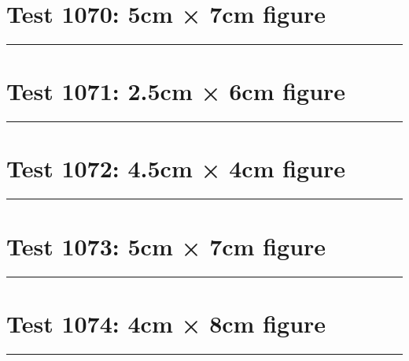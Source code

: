 \documentclass[a4paper,11pt]{article}
\begin{document}
\section*{Test 1070: 5cm × 7cm figure}
\begin{swarmwrap}%
  \begin{minipage}[t]{5cm}
    \centering
    \rule{\linewidth}{7cm}
  \end{minipage}%
\end{swarmwrap}%
\swarmwrapnext
\lipsum[53]
\lipsum[54]
\lipsum[55]
\lipsum[56]
\section*{Test 1071: 2.5cm × 6cm figure}
\begin{swarmwrap}%
  \begin{minipage}[t]{2cm}
    \centering
    \rule{\linewidth}{6cm}
  \end{minipage}%
\end{swarmwrap}%
\swarmwrapnext
\lipsum[35]
\lipsum[36]
\lipsum[37]
\lipsum[38]
\lipsum[39]
\section*{Test 1072: 4.5cm × 4cm figure}
\begin{swarmwrap}%
  \begin{minipage}[t]{4cm}
    \centering
    \rule{\linewidth}{4cm}
  \end{minipage}%
\end{swarmwrap}%
\swarmwrapnext
\lipsum[31]
\lipsum[32]
\lipsum[33]
\lipsum[34]
\lipsum[35]
\section*{Test 1073: 5cm × 7cm figure}
\begin{swarmwrap}%
  \begin{minipage}[t]{5cm}
    \centering
    \rule{\linewidth}{7cm}
  \end{minipage}%
\end{swarmwrap}%
\swarmwrapnext
\lipsum[1]
\lipsum[2]
\lipsum[3]
\lipsum[4]
\lipsum[5]
\lipsum[6]
\section*{Test 1074: 4cm × 8cm figure}
\begin{swarmwrap}%
  \begin{minipage}[t]{4cm}
    \centering
    \rule{\linewidth}{8cm}
  \end{minipage}%
\end{swarmwrap}%
\swarmwrapnext
\lipsum[110]
\lipsum[111]
\lipsum[112]
\lipsum[113]
\lipsum[114]
\end{document}
